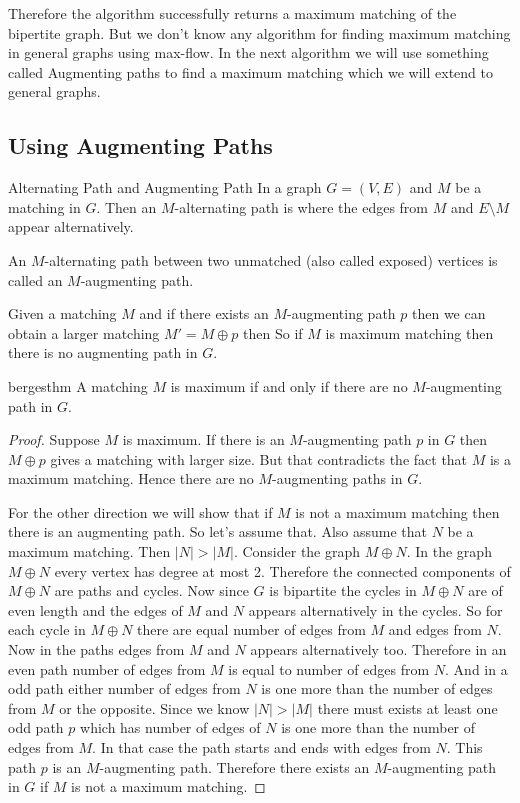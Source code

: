 \documentclass[twoside]{article}
\begin{document}
Therefore the algorithm successfully returns a maximum matching of the bipertite graph. But we don't know any algorithm for finding maximum matching in general graphs using max-flow. In the next algorithm we will use something called Augmenting paths to find a maximum matching which we will extend to general graphs.
\subsection{Using Augmenting Paths}\label{section:bp-augment-path}
\begin{Definition}{Alternating Path and Augmenting Path}{}
	In a graph $G=(V,E)$ and $M$ be a matching in $G$. Then an $M$-alternating path is where the edges from $M$ and $E\setminus M$ appear alternatively.\parinn
	
	An $M$-alternating path between two unmatched (also called exposed) vertices is called an $M$-augmenting path. 
\end{Definition}

Given a matching $M$ and if there exists an $M$-augmenting path $p$ then we can obtain a larger matching $M'=M\oplus p$ then  So if $M$ is maximum matching then there is no augmenting path in $G$.
\begin{Theorem}{}{bergesthm}
	A matching $M$ is maximum if and only if there are no $M$-augmenting path in $G$.
\end{Theorem}
\begin{proof}
	Suppose $M$ is maximum. If there is an $M$-augmenting path $p$ in $G$ then $M\oplus p$  gives a matching with larger size. But that contradicts the fact that $M$ is a maximum matching. Hence there are no $M$-augmenting paths in $G$.
	
	For the other direction we will show that if $M$ is not a maximum matching then there is an augmenting path. So let's assume that. Also assume that $N$ be a maximum matching. Then $|N|>|M|$. Consider the graph $M\oplus N$. In the graph $M\oplus N$ every vertex has degree at most 2. Therefore the connected components of $M\oplus N$ are paths and cycles. Now since $G$ is bipartite the cycles in $M\oplus N$ are of even length and the edges of $M$ and $N$ appears alternatively in the cycles. So for each cycle in $M\oplus N$ there are equal number of edges from $M$ and edges from $N$. Now in the paths edges from $M$ and $N$ appears alternatively  too. Therefore in an even path number of edges from $M$ is equal to number of edges from $N$. And in a odd path either number of edges from $N$ is one more than the number of edges from $M$ or the opposite. Since we know $|N|>|M|$ there must exists at least one odd path $p$ which has number of edges of $N$ is one more than the number of edges from $M$. In that case the path starts and ends with edges from $N$. This path $p$ is an $M$-augmenting path. Therefore there exists an $M$-augmenting path in $G$ if $M$ is not a maximum matching. 
\end{proof}
\end{document}
